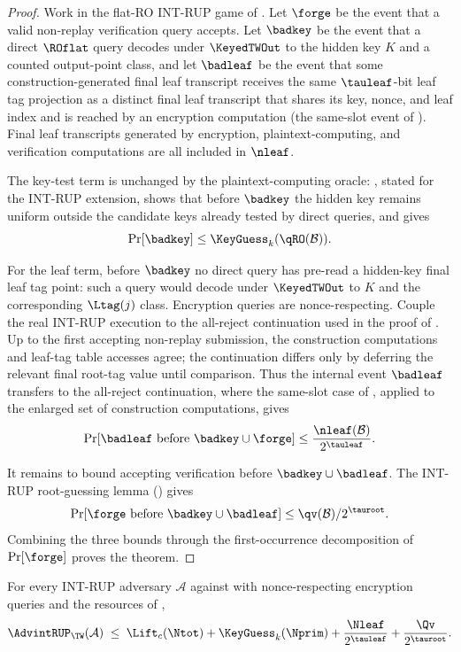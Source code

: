 \begin{proof}
Work in the flat-RO \textsf{INT-RUP} game of . Let
$\forge$ be the event that a valid non-replay verification query accepts.
Let $\badkey$ be the event that a direct $\ROflat$ query decodes under
$\KeyedTWOut$ to the hidden key $K$ and a counted output-point class, and let
$\badleaf$ be the event that some construction-generated final leaf
transcript receives the same $\tauleaf$-bit leaf tag projection as a
distinct final leaf transcript that shares its key, nonce, and leaf index
and is reached by an encryption computation (the same-slot event of
). Final leaf
transcripts generated by encryption, plaintext-computing, and verification
computations are all included in $\nleaf$.

The key-test term is unchanged by the plaintext-computing oracle:
, stated for the \textsf{INT-RUP}
extension, shows that before $\badkey$ the hidden key
remains uniform outside the candidate keys already tested by direct queries,
and  gives
\[
  \Pr[\badkey] \leq \KeyGuess_k(\qRO(\mathcal{B})).
\]

For the leaf term, before $\badkey$ no direct query has pre-read a hidden-key
final leaf tag point: such a query would decode under $\KeyedTWOut$ to $K$ and
the corresponding $\Ltag(j)$ class. Encryption queries are nonce-respecting.
Couple the real \textsf{INT-RUP} execution to the all-reject continuation
used in the proof of . Up to the first
accepting non-replay submission, the construction computations and
leaf-tag table accesses agree; the continuation differs only by
deferring the relevant final root-tag value until comparison. Thus the
internal event $\badleaf$ transfers to the all-reject continuation, where
the same-slot case of , applied to the enlarged
set of construction computations, gives
\[
  \Pr[\badleaf \text{ before } \badkey \cup \forge]
  \leq
  \frac{\nleaf(\mathcal{B})}{2^{\tauleaf}}.
\]

It remains to bound accepting verification before $\badkey \cup \badleaf$.
The \textsf{INT-RUP} root-guessing lemma ()
gives
\[
  \Pr[\forge \text{ before } \badkey \cup \badleaf]
  \leq \qv(\mathcal{B}) / 2^{\tauroot}.
\]
Combining the three bounds through the first-occurrence decomposition
of $\Pr[\forge]$ proves the theorem.
\end{proof}

\begin{theorem}
\label{thm:int-rup}
For every \textsf{INT-RUP} adversary $\mathcal{A}$ against \TW{} with
nonce-respecting encryption queries and the resources of ,
\[
  \AdvintRUP_\TW(\mathcal{A})
  \;\leq\;
  \Lift_c(\Ntot)
  + \KeyGuess_k(\Nprim)
  + \frac{\Nleaf}{2^{\tauleaf}}
  + \frac{\Qv}{2^{\tauroot}}.
\]
\end{theorem}

